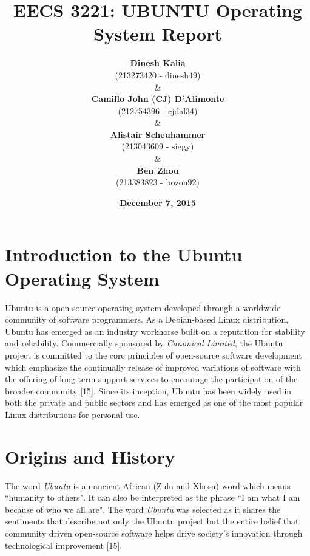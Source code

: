 \documentclass[11pt]{article}
\newcommand{\forceindent}{\leavevmode{\parindent=1em\indent}}
\begin{document}
\setlength{\droptitle}{-3cm}
\title{\textbf{EECS 3221: UBUNTU Operating System Report}}
\author{\textbf{Dinesh Kalia}\\ (213273420 - dinesh49) \\
\& \\
\textbf{Camillo John (CJ) D'Alimonte}\\ (212754396 - cjdal34) \\
\& \\
\textbf{Alistair Scheuhammer}\\ (213043609 - siggy) \\
\& \\
\textbf{Ben Zhou}\\ (213383823 - bozon92)}
\date {\textbf{December 7, 2015}}
\maketitle

\tableofcontents
\newpage

\section{Introduction to the Ubuntu Operating System}

\forceindent Ubuntu is a open-source operating system developed through a worldwide community of software programmers. As a Debian-based Linux distribution, Ubuntu has emerged as an industry workhorse built on a reputation for stability and reliability.  Commercially sponsored by \emph{Canonical Limited}, the Ubuntu project is committed to the core principles of open-source software development which emphasize the continually release of improved variations of software with the offering of long-term support services to encourage the participation of the broader community [15]. Since its inception, Ubuntu has been widely used in both the private and public sectors and has emerged as one of the most popular Linux distributions for personal use.

\section{Origins and History}

\forceindent The word \emph{Ubuntu} is an ancient African (Zulu and Xhosa) word which means ``humanity to others". It can also be interpreted as the phrase ``I am what I am because of who we all are". The word \emph{Ubuntu} was selected as it shares the sentiments that describe not only the Ubuntu project but the entire belief that community driven open-source software helps drive society's innovation through technological improvement [15].\\
\end{document}
